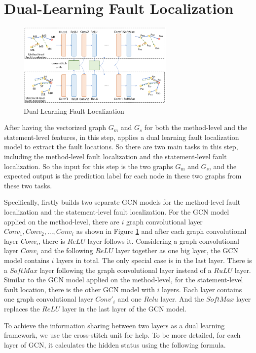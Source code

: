 \section{Dual-Learning Fault Localization}

\begin{figure}[t]
	\centering
	\includegraphics[width=3in]{graphs/dual-learning.png}
	\caption{Dual-Learning Fault Localization}
	\label{dual-learning}
\end{figure}


After having the vectorized graph $G_m$ and $G_s$ for both the method-level and the statement-level features, in this step, \tool applies a dual learning fault localization model to extract the fault locations. So there are two main tasks in this step, including the method-level fault localization and the statement-level fault localization. So the input for this step is the two graphs $G_m$ and $G_s$, and the expected output is the prediction label for each node in these two graphs from these two tasks.

Specifically, \tool firstly builds two separate GCN models \cite{kipf2016semi} for the method-level fault localization and the statement-level fault localization. For the GCN model applied on the method-level, there are $i$ graph convolutional layer $Conv_1, Conv_2, ..., Conv_i$ as shown in Figure \ref{dual-learning} and after each graph convolutional layer $Conv_i$, there is $ReLU$ layer follows it. Considering a graph convolutional layer $Conv_i$ and the following $ReLU$ layer together as one big layer, the GCN model contains $i$ layers in total. The only special case is in the last layer. There is a $SoftMax$ layer following the graph convolutional layer instead of a $RuLU$ layer. Similar to the GCN model applied on the method-level, for the statement-level fault location, there is the other GCN model with $i$ layers. Each layer contains one graph convolutional layer $Conv'_i$ and one $Relu$ layer. And the $SoftMax$ layer replaces the $ReLU$ layer in the last layer of the GCN model.

To achieve the information sharing between two layers as a dual learning framework, we use the cross-stitch unit \cite{misra2016cross} for help. To be more detailed, for each layer of GCN, it calculates the hidden status using the following formula.

